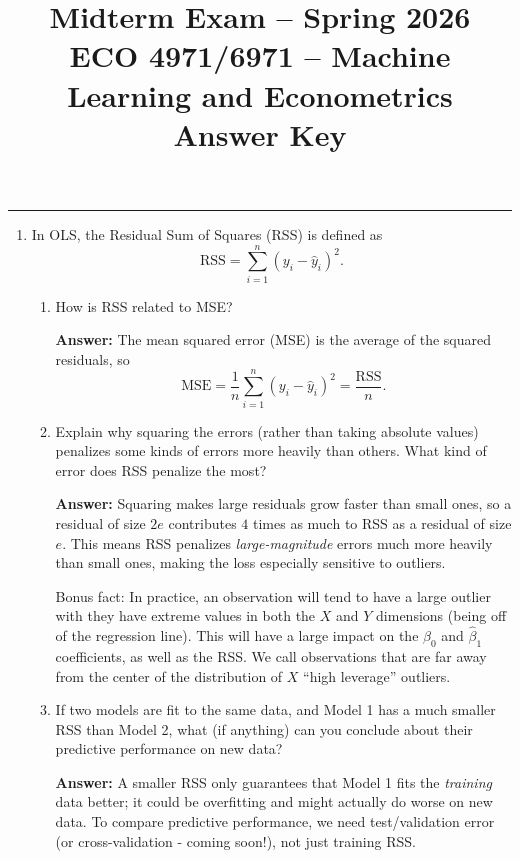 \documentclass[11pt]{article}
\title{Midterm Exam -- Spring 2026\\[0.5em]
  \large ECO 4971/6971 -- Machine Learning and Econometrics\\[0.5em]
  \normalsize \textbf{Answer Key}}
\begin{document}
\maketitle

\bigskip
\hrule
\bigskip

\begin{enumerate}[leftmargin=*]

\item In OLS, the Residual Sum of Squares (RSS) is defined as
$$
  \text{RSS} = \sum_{i=1}^n (y_i - \hat{y}_i)^2.
$$

\begin{enumerate}
  \item How is RSS related to MSE? 

  \textbf{Answer:} The mean squared error (MSE) is the average of the squared residuals, so
  \[
    \text{MSE} = \frac{1}{n} \sum_{i=1}^n (y_i - \hat{y}_i)^2 = \frac{\text{RSS}}{n}.
  \]

  \item Explain why squaring the errors (rather than taking absolute values) penalizes some kinds of errors more heavily than others. What kind of error does RSS penalize the most?

  \textbf{Answer:} Squaring makes large residuals grow faster than small ones, so a residual of size $2e$ contributes $4$ times as much to RSS as a residual of size $e$. This means RSS penalizes \emph{large-magnitude} errors much more heavily than small ones, making the loss especially sensitive to outliers. 
  
Bonus fact: In practice, an observation will tend to have a large outlier with they have extreme values in both the $X$ and $Y$ dimensions (being off of the regression line). This will have a large impact on the $\beta_0$ and $\hat{\beta}_1$ coefficients, as well as the RSS. We call observations that are far away from the center of the distribution of $X$ ``high leverage'' outliers.

  \item If two models are fit to the same data, and Model 1 has a much smaller RSS than Model 2, what (if anything) can you conclude about their predictive performance on new data?

  \textbf{Answer:} A smaller RSS only guarantees that Model 1 fits the \emph{training} data better; it could be overfitting and might actually do worse on new data. To compare predictive performance, we need test/validation error (or cross-validation - coming soon!), not just training RSS.


\end{enumerate}
\end{enumerate}
\end{document}
